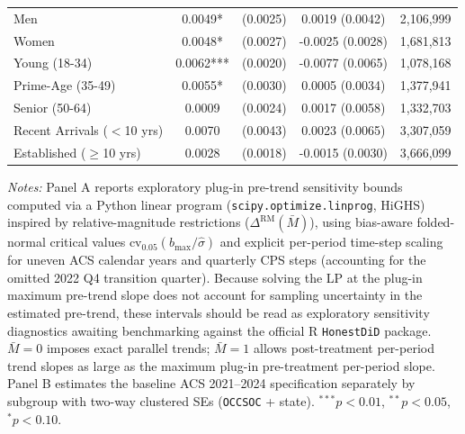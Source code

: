 \begin{table}[htbp]
{\begin{tabular}{lcccc}
Men & 0.0049* & (0.0025) & 0.0019 (0.0042) & 2,106,999 \\
Women & 0.0048* & (0.0027) & -0.0025 (0.0028) & 1,681,813 \\
Young (18-34) & 0.0062*** & (0.0020) & -0.0077 (0.0065) & 1,078,168 \\
Prime-Age (35-49) & 0.0055* & (0.0030) & 0.0005 (0.0034) & 1,377,941 \\
Senior (50-64) & 0.0009 & (0.0024) & 0.0017 (0.0058) & 1,332,703 \\
Recent Arrivals ($<$10 yrs) & 0.0070 & (0.0043) & 0.0023 (0.0065) & 3,307,059 \\
Established ($\ge$10 yrs) & 0.0028 & (0.0018) & -0.0015 (0.0030) & 3,666,099 \\
\bottomrule
\end{tabular}%
}
\vspace{4pt}
\begin{minipage}{\textwidth}\scriptsize
\textit{Notes:} Panel A reports exploratory plug-in pre-trend sensitivity bounds computed via a Python linear program (\texttt{scipy.optimize.linprog}, HiGHS) inspired by \citet{RambachanRoth2023} relative-magnitude restrictions ($\Delta^{\text{RM}}(\bar{M})$), using bias-aware folded-normal critical values $\text{cv}_{0.05}(b_{\max}/\hat{\sigma})$ and explicit per-period time-step scaling for uneven ACS calendar years and quarterly CPS steps (accounting for the omitted 2022 Q4 transition quarter). Because solving the LP at the plug-in maximum pre-trend slope does not account for sampling uncertainty in the estimated pre-trend, these intervals should be read as exploratory sensitivity diagnostics awaiting benchmarking against the official R \texttt{HonestDiD} package. $\bar{M}=0$ imposes exact parallel trends; $\bar{M}=1$ allows post-treatment per-period trend slopes as large as the maximum plug-in pre-treatment per-period slope. Panel B estimates the baseline ACS 2021--2024 specification separately by subgroup with two-way clustered SEs (\texttt{OCCSOC} + state). $^{***}p<0.01$, $^{**}p<0.05$, $^{*}p<0.10$.
\end{minipage}
\end{table}
